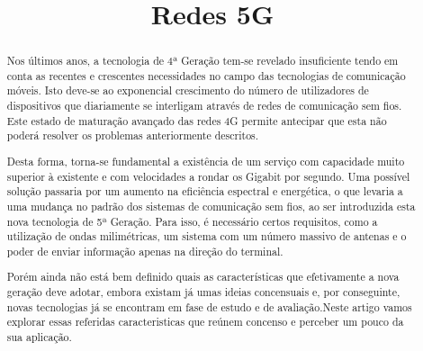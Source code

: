 \documentclass[conference]{IEEEtran}
\begin{document}
\title{Redes 5G}


\author{
\and
{}
}






\maketitle

\begin{abstract}
Nos últimos anos, a tecnologia de 4ª Geração tem-se revelado insuficiente tendo em conta as recentes e crescentes necessidades no campo das tecnologias de comunicação móveis. Isto deve-se ao exponencial crescimento do número de utilizadores de dispositivos que diariamente se interligam através de redes de comunicação sem fios. Este estado de maturação avançado das redes 4G permite antecipar que esta não poderá resolver os problemas anteriormente descritos. \par
Desta forma, torna-se fundamental a existência de um serviço com capacidade muito superior à existente e com velocidades a rondar os Gigabit por segundo. Uma possível solução passaria por um aumento na eficiência espectral e energética, o que levaria a uma mudança no padrão dos sistemas de comunicação sem fios, ao ser introduzida esta nova tecnologia de 5ª Geração. Para isso, é necessário certos requisitos, como a utilização de ondas milimétricas, um sistema com um número massivo de antenas e o poder de enviar informação apenas na direção do terminal. \par
Porém ainda não está bem definido quais as características que efetivamente a nova geração deve adotar, embora existam já umas ideias concensuais e, por conseguinte, novas tecnologias já se encontram em fase de estudo e de avaliação.Neste artigo vamos explorar essas referidas caracteristicas que reúnem concenso e perceber um pouco da sua aplicação. 
\end{abstract}
\end{document}
